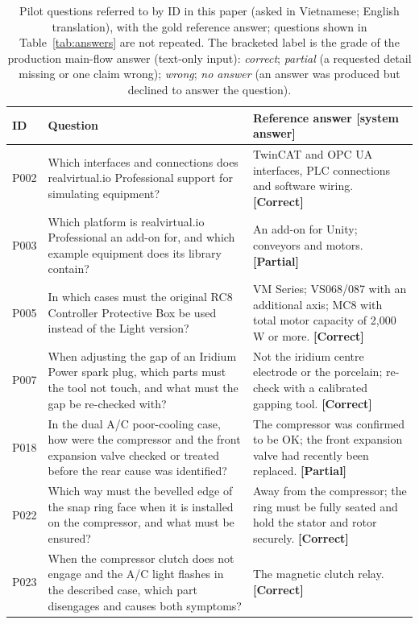 \documentclass[runningheads]{llncs}
\begin{document}
\begin{table}[p]
\centering\scriptsize
\caption{Pilot questions referred to by ID in this paper (asked in Vietnamese; English translation), with the gold reference answer; questions shown in Table~\ref{tab:answers} are not repeated. The bracketed label is the grade of the production main-flow answer (text-only input): \emph{correct}; \emph{partial} (a requested detail missing or one claim wrong); \emph{wrong}; \emph{no answer} (an answer was produced but declined to answer the question).}
\label{tab:questions}
\setlength{\tabcolsep}{3pt}
\begin{tabular}{@{}lp{}p{}@{}}
\toprule
ID & Question & Reference answer \textbf{[system answer]} \\
\midrule
P002 & Which interfaces and connections does realvirtual.io Professional support for simulating equipment? & TwinCAT and OPC UA interfaces, PLC connections and software wiring. \textbf{[Correct]} \\
P003 & Which platform is realvirtual.io Professional an add-on for, and which example equipment does its library contain? & An add-on for Unity; conveyors and motors. \textbf{[Partial]} \\
P005 & In which cases must the original RC8 Controller Protective Box be used instead of the Light version? & VM Series; VS068/087 with an additional axis; MC8 with total motor capacity of 2,000\,W or more. \textbf{[Correct]} \\
P007 & When adjusting the gap of an Iridium Power spark plug, which parts must the tool not touch, and what must the gap be re-checked with? & Not the iridium centre electrode or the porcelain; re-check with a calibrated gapping tool. \textbf{[Correct]} \\
P018 & In the dual A/C poor-cooling case, how were the compressor and the front expansion valve checked or treated before the rear cause was identified? & The compressor was confirmed to be OK; the front expansion valve had recently been replaced. \textbf{[Partial]} \\
P022 & Which way must the bevelled edge of the snap ring face when it is installed on the compressor, and what must be ensured? & Away from the compressor; the ring must be fully seated and hold the stator and rotor securely. \textbf{[Correct]} \\
P023 & When the compressor clutch does not engage and the A/C light flashes in the described case, which part disengages and causes both symptoms? & The magnetic clutch relay. \textbf{[Correct]} \\

\end{tabular}
\end{table}
\end{document}
